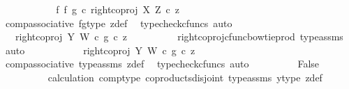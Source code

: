 \begin{isabellebody}
\ \ \ \ \ \ \isamarkupfalse%
\ \isamarkupfalse%
\ {\isachardoublequoteopen}{\isachardot}{\kern0pt}{\isachardot}{\kern0pt}{\isachardot}{\kern0pt}\ {\isacharequal}{\kern0pt}\ {\isacharparenleft}{\kern0pt}{\isacharparenleft}{\kern0pt}f\ {\isasymbowtie}\isactrlsub f\ g{\isacharparenright}{\kern0pt}\ {\isasymcirc}\isactrlsub c\ right{\isacharunderscore}{\kern0pt}coproj\ X\ Z{\isacharparenright}{\kern0pt}\ {\isasymcirc}\isactrlsub c\ z{\isachardoublequoteclose}\isanewline
\ \ \ \ \ \ \ \ \isamarkupfalse%
\ comp{\isacharunderscore}{\kern0pt}associative{}\ fg{\isacharunderscore}{\kern0pt}type\ z{\isacharunderscore}{\kern0pt}def\ \isamarkupfalse%
\ {\isacharparenleft}{\kern0pt}typecheck{\isacharunderscore}{\kern0pt}cfuncs{\isacharcomma}{\kern0pt}\ auto{\isacharparenright}{\kern0pt}\isanewline
\ \ \ \ \ \ \isamarkupfalse%
\ \isamarkupfalse%
\ {\isachardoublequoteopen}{\isachardot}{\kern0pt}{\isachardot}{\kern0pt}{\isachardot}{\kern0pt}\ {\isacharequal}{\kern0pt}\ {\isacharparenleft}{\kern0pt}right{\isacharunderscore}{\kern0pt}coproj\ Y\ W\ {\isasymcirc}\isactrlsub c\ g{\isacharparenright}{\kern0pt}\ {\isasymcirc}\isactrlsub c\ z{\isachardoublequoteclose}\isanewline
\ \ \ \ \ \ \ \ \isamarkupfalse%
\ right{\isacharunderscore}{\kern0pt}coproj{\isacharunderscore}{\kern0pt}cfunc{\isacharunderscore}{\kern0pt}bowtie{\isacharunderscore}{\kern0pt}prod\ type{\isacharunderscore}{\kern0pt}assms\ \isamarkupfalse%
\ auto\isanewline
\ \ \ \ \ \ \isamarkupfalse%
\ \isamarkupfalse%
\ {\isachardoublequoteopen}{\isachardot}{\kern0pt}{\isachardot}{\kern0pt}{\isachardot}{\kern0pt}\ {\isacharequal}{\kern0pt}\ right{\isacharunderscore}{\kern0pt}coproj\ Y\ W\ {\isasymcirc}\isactrlsub c\ g\ {\isasymcirc}\isactrlsub c\ z{\isachardoublequoteclose}\isanewline
\ \ \ \ \ \ \ \ \isamarkupfalse%
\ comp{\isacharunderscore}{\kern0pt}associative{}\ type{\isacharunderscore}{\kern0pt}assms{\isacharparenleft}{\kern0pt}{}{\isacharparenright}{\kern0pt}\ z{\isacharunderscore}{\kern0pt}def\ \isamarkupfalse%
\ {\isacharparenleft}{\kern0pt}typecheck{\isacharunderscore}{\kern0pt}cfuncs{\isacharcomma}{\kern0pt}\ auto{\isacharparenright}{\kern0pt}\isanewline
\ \ \ \ \ \ \isamarkupfalse%
\ \isamarkupfalse%
\ False\isanewline
\ \ \ \ \ \ \ \ \isamarkupfalse%
\ calculation\ comp{\isacharunderscore}{\kern0pt}type\ coproducts{\isacharunderscore}{\kern0pt}disjoint\ type{\isacharunderscore}{\kern0pt}assms{\isacharparenleft}{\kern0pt}{}{\isacharparenright}{\kern0pt}\ y{\isacharunderscore}{\kern0pt}type{}\ z{\isacharunderscore}{\kern0pt}def\ \isamarkupfalse%

\end{isabellebody}
